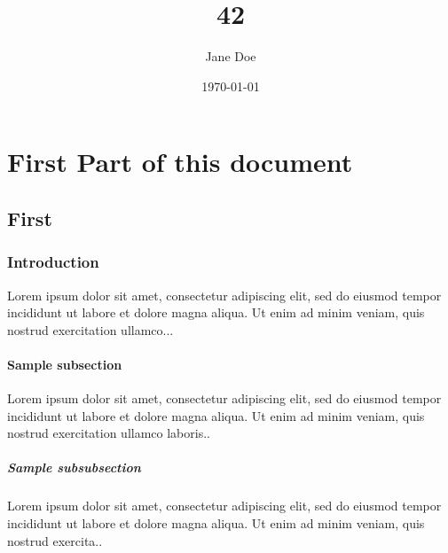 \documentclass{book}
\title{42}
\author{Jane Doe}
\date{\today}
\begin{document}
 
\maketitle
 
\tableofcontents
 
\part{First Part of this document}
 
\chapter{First}
 
\section{Introduction}
Lorem ipsum dolor sit amet, consectetur adipiscing elit, sed do 
eiusmod tempor incididunt ut labore et dolore magna aliqua. Ut 
enim ad minim veniam, quis nostrud exercitation ullamco...
 
\subsection{Sample subsection}
Lorem ipsum dolor sit amet, consectetur adipiscing elit, sed do 
eiusmod tempor incididunt ut labore et dolore magna aliqua. Ut 
enim ad minim veniam, quis nostrud exercitation ullamco laboris..
 
\subsubsection{Sample subsubsection}
Lorem ipsum dolor sit amet, consectetur adipiscing elit, sed do 
eiusmod tempor incididunt ut labore et dolore magna aliqua. Ut 
enim ad minim veniam, quis nostrud exercita..



 
\end{document}
